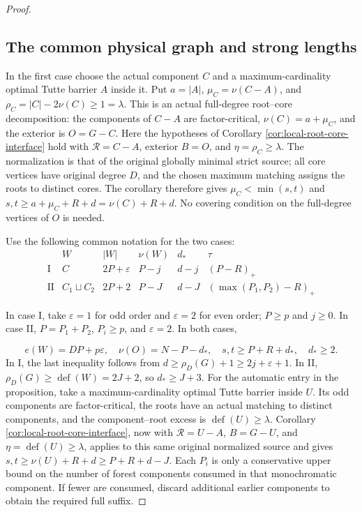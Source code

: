 \documentclass[11pt,a4paper]{article}
\theoremstyle{definition}
\begin{document}
\begin{proof}
\subsection*{The common physical graph and strong lengths}
In the first case choose the actual component $C$ and a maximum-cardinality
optimal Tutte barrier $A$ inside it. Put
$a=|A|$, $\mu_C=\nu(C-A)$, and
$\rho_C=|C|-2\nu(C)\ge1=\lambda$.
This is an actual full-degree root--core decomposition:
the components of $C-A$ are factor-critical,
$\nu(C)=a+\mu_C$, and the exterior is $O=G-C$.
Here the hypotheses of Corollary \ref{cor:local-root-core-interface}
hold with $\mathcal R=C-A$, exterior $B=O$, and $\eta=\rho_C\ge\lambda$.
The normalization is that of the original globally minimal strict source;
all core vertices have original degree $D$, and the chosen maximum matching
assigns the roots to distinct cores. The corollary therefore gives
$\mu_C<\min(s,t)$ and $s,t\ge a+\mu_C+R+d=\nu(C)+R+d$.
No covering condition on the full-degree vertices of $O$ is needed.

Use the following common notation for the two cases:
\[
\begin{array}{c|c|c|c|c|c}
 &W& |W|&\nu(W)&d_*&\tau\\\hline
\mathrm I&C&2P+\varepsilon&P-j&d-j&(P-R)_+\\
\mathrm {II}&C_1\sqcup C_2&2P+2&P-J&d-J&(\max(P_1,P_2)-R)_+
\end{array}
\]

In case I, take $\varepsilon=1$ for odd order and $\varepsilon=2$ for even order;
$P\ge p$ and $j\ge0$. In case II, $P=P_1+P_2$, $P_i\ge p$, and $\varepsilon=2$.
In both cases,

\begin{equation}\label{eq:regular-account}
 e(W)=DP+p\varepsilon,\quad
 \nu(O)=N-P-d_*,\quad s,t\ge P+R+d_*,\quad d_*\ge2 .
\end{equation}
In I, the last inequality follows from
$d\ge\rho_D(G)+1\ge2j+\varepsilon+1$.
In II, $\rho_D(G)\ge\operatorname{def}(W)=2J+2$, so $d_*\ge J+3$.
For the automatic entry in the proposition, take a maximum-cardinality
optimal Tutte barrier inside $U$. Its odd components are factor-critical,
the roots have an actual matching to distinct components, and the
component--root excess is $\operatorname{def}(U)\ge\lambda$.
Corollary \ref{cor:local-root-core-interface}, now with
$\mathcal R=U-A$, $B=G-U$, and $\eta=\operatorname{def}(U)\ge\lambda$,
applies to this same original normalized source and gives
$s,t\ge\nu(U)+R+d\ge P+R+d-J$.
Each $P_i$ is only a conservative upper bound on the number of forest
components consumed in that monochromatic component. If fewer are
consumed, discard additional earlier components to obtain the required full suffix.


\end{proof}
\end{document}
